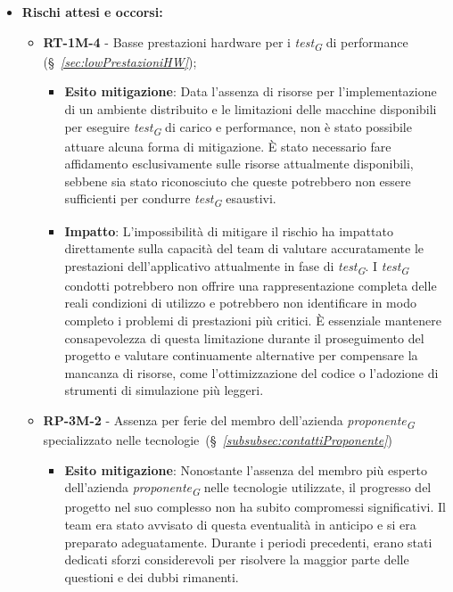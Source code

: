 \begin{itemize}
    \item \textbf{Rischi attesi e occorsi:}
        \begin{itemize}
            \item \textbf{RT-1M-4} - Basse prestazioni hardware per i \textit{test}\textsubscript{\textit{G}} di performance (\S~\textit{\ref{sec:lowPrestazioniHW}});
            \begin{itemize}
                \item \textbf{Esito mitigazione}: Data l'assenza di risorse per l'implementazione di un ambiente distribuito e le limitazioni delle macchine disponibili per eseguire \textit{test}\textsubscript{\textit{G}} di carico e performance, non è stato possibile attuare alcuna forma di mitigazione. È stato necessario fare affidamento esclusivamente sulle risorse attualmente disponibili, sebbene sia stato riconosciuto che queste potrebbero non essere sufficienti per condurre \textit{test}\textsubscript{\textit{G}} esaustivi.
                \item \textbf{Impatto}: L'impossibilità di mitigare il rischio ha impattato direttamente sulla capacità del team di valutare accuratamente le prestazioni dell'applicativo attualmente in fase di \textit{test}\textsubscript{\textit{G}}. I \textit{test}\textsubscript{\textit{G}} condotti potrebbero non offrire una rappresentazione completa delle reali condizioni di utilizzo e potrebbero non identificare in modo completo i problemi di prestazioni più critici. È essenziale mantenere consapevolezza di questa limitazione durante il proseguimento del progetto e valutare continuamente alternative per compensare la mancanza di risorse, come l'ottimizzazione del codice o l'adozione di strumenti di simulazione più leggeri.
            \end{itemize}
            \item \textbf{RP-3M-2} - Assenza per ferie del membro dell'azienda \textit{proponente}\textsubscript{\textit{G}} specializzato nelle tecnologie~(\S~\textit{\ref{subsubsec:contattiProponente}})
                \begin{itemize}
                    \item \textbf{Esito mitigazione}: Nonostante l'assenza del membro più esperto dell'azienda \textit{proponente}\textsubscript{\textit{G}} nelle tecnologie utilizzate, il progresso del progetto nel suo complesso non ha subito compromessi significativi. Il team era stato avvisato di questa eventualità in anticipo e si era preparato adeguatamente. Durante i periodi precedenti, erano stati dedicati sforzi considerevoli per risolvere la maggior parte delle questioni e dei dubbi rimanenti.

\end{itemize}
\end{itemize}
\end{itemize}
